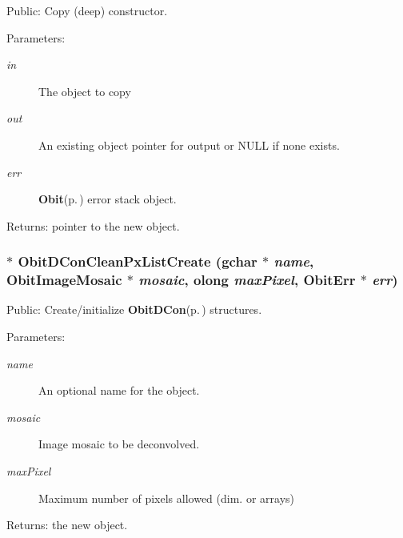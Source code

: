 Public: Copy (deep) constructor. 

\begin{Desc}
\item[Parameters:]
\begin{description}
\item[{\em in}]The object to copy \item[{\em out}]An existing object pointer for output or NULL if none exists. \item[{\em err}]{\bf Obit}{\rm (p.\,\pageref{structObit})} error stack object. \end{description}
\end{Desc}
\begin{Desc}
\item[Returns:]pointer to the new object. \end{Desc}
\subsubsection{$\ast$ Obit\-DCon\-Clean\-Px\-List\-Create (gchar $\ast$ {\em name}, {\bf Obit\-Image\-Mosaic} $\ast$ {\em mosaic}, {\bf olong} {\em max\-Pixel}, {\bf Obit\-Err} $\ast$ {\em err})}\label{ObitDConCleanPxList_8c_a14}


Public: Create/initialize {\bf Obit\-DCon}{\rm (p.\,\pageref{structObitDCon})} structures. 

\begin{Desc}
\item[Parameters:]
\begin{description}
\item[{\em name}]An optional name for the object. \item[{\em mosaic}]Image mosaic to be deconvolved. \item[{\em max\-Pixel}]Maximum number of pixels allowed (dim. or arrays) \end{description}
\end{Desc}
\begin{Desc}
\item[Returns:]the new object. \end{Desc}
